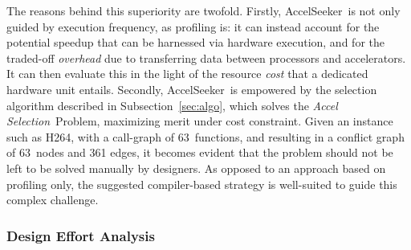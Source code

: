 \documentclass[]{usiinfthesis}
\newcommand{\aseeker}{{AccelSeeker}}
\newcommand{\asprobname}{\emph{Accel Selection}}
\newcommand{\numberOfcandidates}{{63}}
\begin{document}
The reasons behind this superiority are twofold. Firstly, \aseeker\
is not only guided by execution frequency, as profiling is: it can
instead account for the potential speedup that can be harnessed via
hardware execution, and for the traded-off \emph{overhead} due to
transferring data between processors and accelerators. It can then evaluate 
this in the light of the resource \emph{cost} that a dedicated hardware unit 
entails. Secondly, \aseeker\ is empowered by the
selection algorithm described in Subsection~\ref{sec:algo}, which
solves the \asprobname\ Problem, maximizing merit under cost
constraint. Given an instance such as H264, with a call-graph of \numberOfcandidates\
functions, and resulting in a conflict graph of \numberOfcandidates\ nodes and 361
edges, it becomes evident that the problem should not be left to be
solved manually by designers. As opposed to an approach based on
profiling only, the suggested compiler-based strategy is well-suited to
guide this complex challenge.


%
%
%
\subsubsection{Design Effort Analysis}
\end{document}
